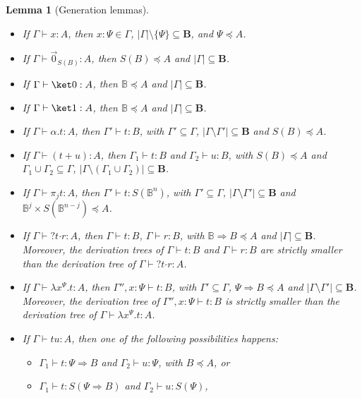\documentclass[preprint]{elsarticle}
\newtheorem{lemma}[theorem]{Lemma}
\newcommand\B{\ensuremath{\mathbb B}}
\newcommand\gB{\ensuremath{\Psi}}
\newcommand\ite[3]{{#1}?{#2}\mathord{\cdot}{#3}}
\newcommand\pair[2]{({#1}+{#2})}
\newcommand\bqtypes{\ensuremath{\mathbf B}}
\newcommand\z[1][A]{\vec 0_{S(#1)}}
\begin{document}
\begin{lemma}
  [Generation lemmas]~
  \label{lem:generation}
  \begin{itemize}
  \item If $\Gamma\vdash x:A$, then $x:\gB\in\Gamma$,
    $|\Gamma|\setminus\{\gB\}\subseteq\bqtypes$, and $\gB\preceq A$.
  \item If $\Gamma\vdash \z[B]:A$, then $S(B)\preceq A$ and
    $|\Gamma|\subseteq\bqtypes$.
  \item If $\Gamma\vdash\ket 0:A$, then $\B\preceq A$ and
    $|\Gamma|\subseteq\bqtypes$.
  \item If $\Gamma\vdash\ket 1:A$, then $\B\preceq A$ and
    $|\Gamma|\subseteq\bqtypes$.
  \item If $\Gamma\vdash \alpha.t:A$, then $\Gamma'\vdash t:B$, with
    $\Gamma'\subseteq\Gamma$, $|\Gamma\setminus\Gamma'|\subseteq\bqtypes$ and
    $S(B)\preceq A$.
  \item If $\Gamma\vdash\pair tu:A$, then $\Gamma_1\vdash t:B$ and
    $\Gamma_2\vdash u:B$, with $S(B)\preceq A$ and
    $\Gamma_1\cup\Gamma_2\subseteq\Gamma$,
    $|\Gamma\setminus(\Gamma_1\cup\Gamma_2)|\subseteq\bqtypes$.
  \item If $\Gamma\vdash\pi_j t:A$, then $\Gamma'\vdash t:S(\B^n)$, with
    $\Gamma'\subseteq\Gamma$, $|\Gamma\setminus\Gamma'|\subseteq\bqtypes$ and
    $\B^j\times S(\B^{n-j})\preceq A$.
  \item If $\Gamma\vdash\ite{}{t}{r}:A$, then $\Gamma\vdash t:B$, $\Gamma\vdash
    r:B$, with $\B\Rightarrow B\preceq A$ and $|\Gamma|\subseteq\bqtypes$.
    Moreover, the derivation trees of $\Gamma\vdash t:B$ and $\Gamma\vdash r:B$
    are strictly smaller than the derivation tree of $\Gamma\vdash\ite{}tr:A$.
  \item If $\Gamma\vdash\lambda x^{\gB}.t:A$, then $\Gamma'',x:\gB\vdash t:B$,
    with $\Gamma'\subseteq\Gamma$, $\gB\Rightarrow B\preceq A$ and
    $|\Gamma\setminus\Gamma'|\subseteq\bqtypes$. Moreover, the derivation tree of
    $\Gamma'',x:\gB\vdash t:B$ is strictly smaller than the derivation tree of
    $\Gamma\vdash\lambda x^{\gB}.t:A$.
  \item If $\Gamma\vdash tu:A$, then one of the following possibilities happens:
    \begin{itemize}
    \item $\Gamma_1\vdash t:\gB\Rightarrow B$ and $\Gamma_2\vdash u:\gB$, with
      $B\preceq A$, or
    \item $\Gamma_1\vdash t:S(\gB\Rightarrow B)$ and $\Gamma_2\vdash u:S(\gB)$,

\end{itemize}
\end{itemize}
\end{lemma}
\end{document}

